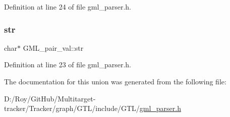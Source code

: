 Definition at line 24 of file gml\+\_\+parser.\+h.

\mbox{\label{union_g_m_l__pair__val_a8d2623e5827be15b91bf98dbd668e371}} 
\subsubsection{\texorpdfstring{str}{str}}
{\footnotesize\ttfamily char$\ast$ G\+M\+L\+\_\+pair\+\_\+val\+::str}



Definition at line 23 of file gml\+\_\+parser.\+h.



The documentation for this union was generated from the following file\+:\begin{DoxyCompactItemize}
\item 
D\+:/\+Roy/\+Git\+Hub/\+Multitarget-\/tracker/\+Tracker/graph/\+G\+T\+L/include/\+G\+T\+L/\mbox{\hyperlink{gml__parser_8h}{gml\+\_\+parser.\+h}}\end{DoxyCompactItemize}
